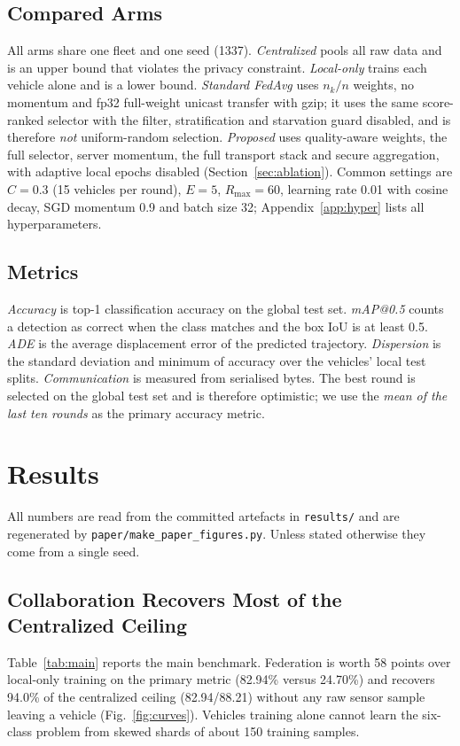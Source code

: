 \documentclass[journal]{IEEEtran}
\newcommand{\code}[1]{\texttt{#1}}
\begin{document}
\subsection{Compared Arms}
All arms share one fleet and one seed (1337). \emph{Centralized} pools all raw data and is an upper bound that violates the privacy constraint. \emph{Local-only} trains each vehicle alone and is a lower bound. \emph{Standard FedAvg} uses $n_k/n$ weights, no momentum and fp32 full-weight unicast transfer with gzip; it uses the same score-ranked selector with the filter, stratification and starvation guard disabled, and is therefore \emph{not} uniform-random selection. \emph{Proposed} uses quality-aware weights, the full selector, server momentum, the full transport stack and secure aggregation, with adaptive local epochs disabled (Section~\ref{sec:ablation}). Common settings are $C=0.3$ (15 vehicles per round), $E=5$, $R_{\max}=60$, learning rate 0.01 with cosine decay, SGD momentum 0.9 and batch size 32; Appendix~\ref{app:hyper} lists all hyperparameters.

\subsection{Metrics}
\emph{Accuracy} is top-1 classification accuracy on the global test set. \emph{mAP@0.5} counts a detection as correct when the class matches and the box IoU is at least 0.5. \emph{ADE} is the average displacement error of the predicted trajectory. \emph{Dispersion} is the standard deviation and minimum of accuracy over the vehicles' local test splits. \emph{Communication} is measured from serialised bytes. The best round is selected on the global test set and is therefore optimistic; we use the \emph{mean of the last ten rounds} as the primary accuracy metric.

\section{Results}\label{sec:results}
All numbers are read from the committed artefacts in \code{results/} and are regenerated by \code{paper/make\_paper\_figures.py}. Unless stated otherwise they come from a single seed.

\subsection{Collaboration Recovers Most of the Centralized Ceiling}\label{sec:collab}
Table~\ref{tab:main} reports the main benchmark. Federation is worth 58 points over local-only training on the primary metric (82.94\% versus 24.70\%) and recovers 94.0\% of the centralized ceiling (82.94/88.21) without any raw sensor sample leaving a vehicle (Fig.~\ref{fig:curves}). Vehicles training alone cannot learn the six-class problem from skewed shards of about 150 training samples.
\end{document}
